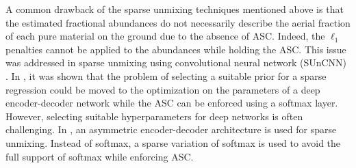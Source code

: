 A common drawback of the sparse unmixing techniques mentioned above is that the estimated fractional abundances do not necessarily describe the aerial fraction of each pure material on the ground due to the absence of ASC. Indeed, the $\ell_1$ penalties cannot be applied to the abundances while holding the ASC. This issue was addressed in sparse unmixing using convolutional neural network (SUnCNN) \cite{rasti_suncnn_2022}. In \cite{rasti_suncnn_2022}, it was shown that the problem of selecting a suitable prior for a sparse regression could be moved to the optimization on the parameters of a deep encoder-decoder network while the ASC can be enforced using a softmax layer. However, selecting suitable hyperparameters for deep networks is often challenging. In \cite{lin_addressing_2022}, an asymmetric encoder-decoder architecture is used for sparse unmixing. Instead of softmax, a sparse variation of softmax is used to avoid the full support of softmax while enforcing ASC. 

